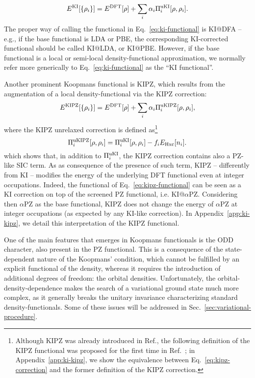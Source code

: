 %
\begin{equation}
    E^{\rm KI}[\{\rho_i\}] = E^{\rm DFT}[\rho] + \sum_i \alpha_i \Pi_i^{\rm uKI}[\rho, \rho_i] .
    \label{eq:ki-functional}
\end{equation}
%
The proper way of calling the functional in Eq.~\eqref{eq:ki-functional} is KI@DFA -- e.g., if the base functional is LDA or PBE, the corresponding KI-corrected functional should be called KI@LDA, or KI@PBE. However, if the base functional is a local or semi-local density-functional approximation, we normally refer more generically to Eq.~\eqref{eq:ki-functional} as the ``KI functional''.

Another prominent Koopmans functional is KIPZ, which results from the augmentation of a local density-functional via the KIPZ correction:
%
\begin{equation}
    E^{\rm KIPZ}[\{\rho_i\}] = E^{\rm DFT}[\rho] + \sum_i \alpha_i \Pi_i^{\rm uKIPZ}[\rho, \rho_i] ,
    \label{eq:kipz-functional}
\end{equation}
%
where the KIPZ unrelaxed correction is defined as\footnote{Although KIPZ was already introduced in Ref.\cite{borghi_koopmans-compliant_2014}, the following definition of the KIPZ functional was proposed for the first time in Ref.~\cite{borghi_variational_2015}; in Appendix~\ref{app:ki-kipz}, we show the equivalence between Eq.~\eqref{eq:kipz-correction} and the former definition of the KIPZ correction.}
%
\begin{equation}
    \Pi_i^{\rm uKIPZ}[\rho,\rho_i] = \Pi_i^{\rm uKI}[\rho,\rho_i] - f_i E_{\rm Hxc}[n_i] .
    \label{eq:kipz-correction}
\end{equation}
%
which shows that, in addition to $\Pi_i^{\rm uKI}$, the KIPZ correction contains also a PZ-like SIC term. As as consequence of the presence of such term, KIPZ -- differently from KI -- modifies the energy of the underlying DFT functional even at integer occupations. Indeed, the functional of Eq.~\eqref{eq:kipz-functional} can be seen as a KI correction on top of the screened PZ functional, i.e. KI@$\alpha$PZ. Considering then $\alpha$PZ as the base functional, KIPZ does not change the energy of $\alpha$PZ at integer occupations (as expected by any KI-like correction). In Appendix~\ref{app:ki-kipz}, we detail this interpretation of the KIPZ functional.

One of the main features that emerges in Koopmans functionals is the ODD character, also present in the PZ functional. This is a consequence of the state-dependent nature of the Koopmans' condition, which cannot be fulfilled by an explicit functional of the density, whereas it requires the introduction of additional degrees of freedom: the orbital densities. Unfortunately, the orbital-density-dependence makes the search of a variational ground state much more complex, as it generally breaks the unitary invariance characterizing standard density-functionals. Some of these issues will be addressed in Sec.~\ref{sec:variational-procedure}.

